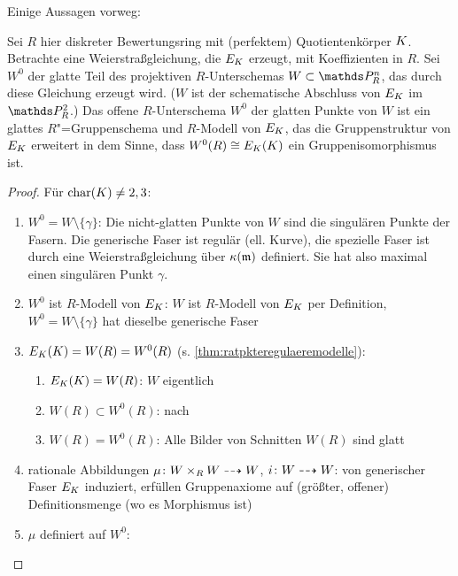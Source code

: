 \documentclass[german]{scrreprt}
\begin{document}
Einige Aussagen vorweg:
\begin{Lemma}\label{thm:erweiterunggruppenstruktur}
  Sei $R$ hier diskreter Bewertungsring mit (perfektem) Quotientenkörper
  $K$.
  Betrachte eine Weierstraßgleichung, die $E_{K}$ erzeugt, mit
  Koeffizienten in $R$.
  Sei $W^0$ der glatte Teil des projektiven $R$-Unterschemas
  $W\subset\P_R^n$, das durch diese Gleichung erzeugt wird.
  ($W$ ist der schematische Abschluss von $E_{K}$ im $\P_R^2$.)
  Das offene $R$-Unterschema $W^0$ der glatten Punkte von $W$ ist ein
  glattes $R$"=Gruppenschema und $R$-Modell von $E_{K}$, das die
  Gruppenstruktur von $E_{K}$ erweitert in dem
  Sinne, dass $W^0(R)\cong E_{K}(K)$ ein Gruppenisomorphismus ist.
  \cite[Theorem IV.5.3 (c)]{silverman2}
  \begin{proof} Für $\operatorname{char}(K)\neq 2,3$:
    \begin{enumerate}
    \item $W^0=W\setminus\{\gamma\}$:
      \cite[Remark IV.5.4.2]{silverman2}
      Die nicht-glatten Punkte von $W$ sind die singulären Punkte
      der Fasern.
      Die generische Faser ist regulär (ell. Kurve), die spezielle
      Faser ist durch eine Weierstraßgleichung über $\kappa(\mathfrak{m})$
      definiert. Sie hat also maximal einen singulären Punkt $\gamma$.
      \cite[Proposition III.1.4 (a)]{silverman}
    \item $W^0$ ist $R$-Modell von $E_{K}$:
      $W$ ist $R$-Modell von $E_{K}$ per Definition,
      $W^0=W\setminus\{\gamma\}$ hat dieselbe generische Faser
    \item \cite[Corollary IV.4.4]{silverman2}
      $E_{K}(K)=W(R)=W^0(R)$
      (s. \autoref{thm:ratpkteregulaeremodelle}):
      \begin{enumerate}
      \item $E_{K}(K)=W(R)$: $W$ eigentlich
      \item $W(R)\subset W^0(R)$:
        nach \cite[Proposition IV.4.3 (b)]{silverman2}
      \item $W(R)=W^0(R)$: Alle Bilder von Schnitten $W(R)$ sind
        glatt
      \end{enumerate}
    \item rationale Abbildungen
      $\mu\colon W\times_R W\dashrightarrow W$,
      $i\colon W\dashrightarrow W$:
      von generischer Faser $E_{K}$ induziert, erfüllen Gruppenaxiome
      auf (größter, offener) Definitionsmenge (wo es Morphismus ist)
    \item $\mu$ definiert auf $W^0$:
      \begin{enumerate}

\end{enumerate}
\end{enumerate}
\end{proof}
\end{Lemma}
\end{document}
